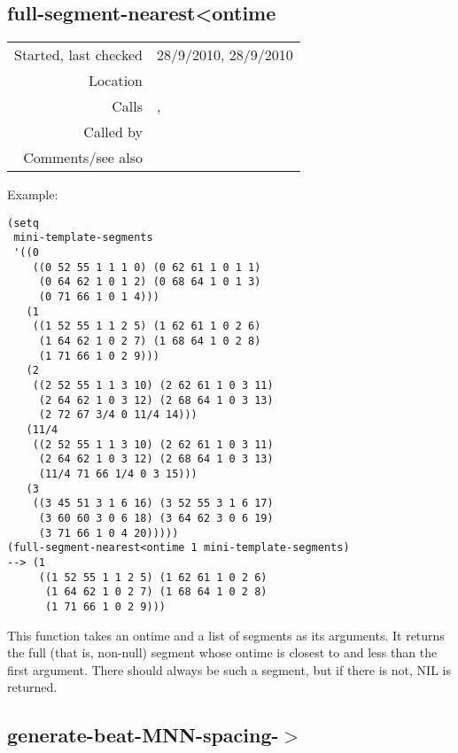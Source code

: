 \subsection*{full-segment-nearest<ontime}\label{fun:full-segment-nearest<ontime}

\vspace{0.3cm}
\begin{tabular}{r|p{8cm}}
Started, last checked & 28/9/2010, 28/9/2010 \\
Location & \nameref{sec:generating-beat-MNN-spacing-forwards} \\
Calls & \nameref{fun:index-1st-sublist-item>}, \nameref{fun:nth-list-of-lists} \\
Called by & \nameref{fun:mean-and-rangep} \\
Comments/see also &
\end{tabular}

\vspace{0.5cm}
\noindent Example:
\begin{verbatim}
(setq
 mini-template-segments
 '((0
    ((0 52 55 1 1 1 0) (0 62 61 1 0 1 1)
     (0 64 62 1 0 1 2) (0 68 64 1 0 1 3)
     (0 71 66 1 0 1 4)))
   (1
    ((1 52 55 1 1 2 5) (1 62 61 1 0 2 6)
     (1 64 62 1 0 2 7) (1 68 64 1 0 2 8)
     (1 71 66 1 0 2 9)))
   (2
    ((2 52 55 1 1 3 10) (2 62 61 1 0 3 11)
     (2 64 62 1 0 3 12) (2 68 64 1 0 3 13)
     (2 72 67 3/4 0 11/4 14)))
   (11/4
    ((2 52 55 1 1 3 10) (2 62 61 1 0 3 11)
     (2 64 62 1 0 3 12) (2 68 64 1 0 3 13)
     (11/4 71 66 1/4 0 3 15)))
   (3
    ((3 45 51 3 1 6 16) (3 52 55 3 1 6 17)
     (3 60 60 3 0 6 18) (3 64 62 3 0 6 19)
     (3 71 66 1 0 4 20)))))
(full-segment-nearest<ontime 1 mini-template-segments)
--> (1
     ((1 52 55 1 1 2 5) (1 62 61 1 0 2 6)
      (1 64 62 1 0 2 7) (1 68 64 1 0 2 8)
      (1 71 66 1 0 2 9)))
\end{verbatim}

\noindent This function takes an ontime and a list of
segments as its arguments. It returns the full (that
is, non-null) segment whose ontime is closest to and
less than the first argument. There should always be
such a segment, but if there is not, NIL is
returned.


\subsection*{generate-beat-MNN-spacing-$>$}\label{fun:generate-beat-MNN-spacing->}

